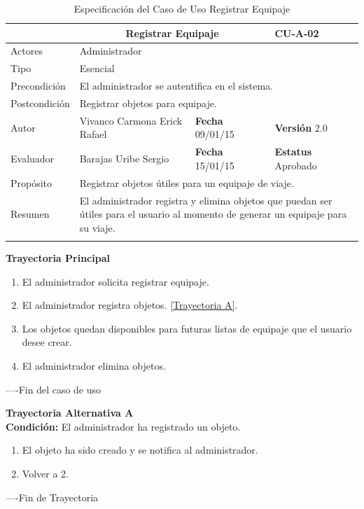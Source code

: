 \begin{longtable}{|p{2.5cm}|p{6.4cm}|p{2cm}|p{2cm}|}
	\hline
		\rowcolor[RGB]{255,102,102}{Caso de Uso}&\multicolumn{2}{c}{Registrar Equipaje}&{\textbf{CU-A-02}}\\
	\hline
		{Actores}&\multicolumn{3}{p{11.2cm}|}{Administrador}\\
	\hline
		{Tipo}&\multicolumn{3}{p{11.2cm}|}{Esencial}\\
	\hline
		{Precondición}&\multicolumn{3}{p{11.2cm}|}{El administrador se autentifica en el sistema.}\\
	\hline
		{Postcondición}&\multicolumn{3}{p{11.2cm}|}{Registrar objetos para equipaje.}\\
	\hline
		{Autor}&{Vivanco Carmona Erick Rafael}&{\textbf{Fecha} 09/01/15}&{\textbf{Versión} 2.0}\\
			\hline
		{Evaluador}&{Barajas Uribe Sergio}&{\textbf{Fecha} 15/01/15}&{\textbf{Estatus} Aprobado}\\
	\hline
		{Propósito}&\multicolumn{3}{p{11.2cm}|}{Registrar objetos útiles para un equipaje de viaje.}\\
	\hline
		{Resumen}&\multicolumn{3}{p{11.2cm}|}{El administrador registra y elimina objetos que puedan ser útiles para el usuario al momento de generar un equipaje para su viaje.}\\	
	\hline
	\caption[Especificación del Caso de Uso Registrar Equipaje]{Especificación del Caso de Uso Registrar Equipaje}
    	\label{tab:cuRegistrarEquipaje}
\end{longtable}

\begin{flushleft}
	\textbf{Trayectoria Principal}\\
	\begin{enumerate}
		\item El administrador solicita registrar equipaje.
		\item El administrador registra objetos. \hyperlink{TrayectoriaA_CU-A-02}{[Trayectoria A]}.
		\item Los objetos quedan disponibles para futuras listas de equipaje que el usuario desee crear.
		\item El administrador elimina objetos.
	\end{enumerate}
\end{flushleft}
----Fin del caso de uso

\begin{flushleft}
	\hypertarget{TrayectoriaA_CU-A-02}{}
	\textbf{Trayectoria Alternativa A}\\
	\textbf{Condición:} El administrador ha registrado un objeto. \\
	\begin{enumerate}
		\item El objeto ha sido creado y se notifica al administrador. 
		\item Volver a 2.
	\end{enumerate}
\end{flushleft}
----Fin de Trayectoria

